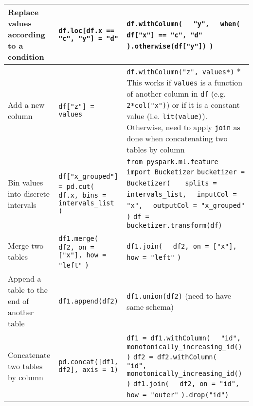 \documentclass{article}
\begin{document}
\begin{longtable}[l]{| p{} | p{} | p{} |}
Replace values according to a condition &
\verb|df.loc[df.x == "c", "y"] = "d"| &
\verb|df.withColumn(| \newline
\verb|  "y",| \newline
\verb|  when(| \newline
\verb|    df["x"] == "c", "d"| \newline
\verb|  ).otherwise(df["y"])| \newline
\verb|)| \\
\hline

Add a new column &
\verb|df["z"] = values| &
\verb|df.withColumn("z", values*)| \newline
* This works if \verb|values| is a function of another column in \verb|df| 
(e.g. \verb|2*col("x")|) or if it is a constant value (i.e. \verb|lit(value)|). 
Otherwise, need to apply \verb|join| as done when concatenating two tables by column \\
\hline

Bin values into discrete intervals &
\verb|df["x_grouped"] = pd.cut(| \newline
\verb|  df.x, bins = intervals_list| \newline
\verb|)| &
\verb|from pyspark.ml.feature import Bucketizer| \newline
\verb|bucketizer = Bucketizer( |\newline
\verb|  splits = intervals_list,| \newline
\verb|  inputCol = "x",| \newline
\verb|  outputCol = "x_grouped"| \newline
\verb|)| \newline
\verb|df = bucketizer.transform(df)| \\
\hline

Merge two tables & 
\verb|df1.merge(| \newline
\verb|  df2, on = ["x"], how = "left"| \newline
\verb|)| &
\verb|df1.join(| \newline
\verb|  df2, on = ["x"], how = "left"| \newline
\verb|)| \\
\hline

Append a table to the end of another table & 
\verb|df1.append(df2)| &
\verb|df1.union(df2)| (need to have same schema) \\
\hline

Concatenate two tables by column & 
\verb|pd.concat([df1, df2], axis = 1)| &
\verb|df1 = df1.withColumn(| \newline
\verb|  "id", monotonically_increasing_id()| \newline
\verb|)| \newline
\verb|df2 = df2.withColumn(| \newline
\verb|  "id", monotonically_increasing_id()| \newline
\verb|)| \newline
\verb|df1.join(| \newline
\verb|  df2, on = "id", how = "outer"| \newline
\verb|).drop("id")| \\
\hline


\end{longtable}
\end{document}

